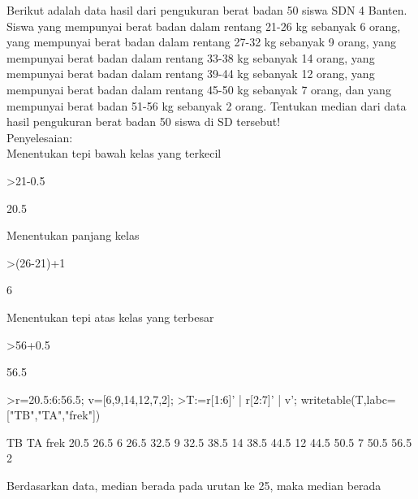\documentclass[a4paper,10pt]{article}
\begin{document}
\begin{eulernotebook}
\begin{eulercomment}
\begin{eulercomment}
\begin{eulercomment}
\begin{eulercomment}
\begin{eulercomment}
\begin{eulercomment}
\begin{eulercomment}
\end{eulercomment}
\begin{eulercomment}
Berikut adalah data hasil dari pengukuran berat badan 50 siswa SDN 4
Banten. Siswa yang mempunyai berat badan dalam rentang 21-26 kg
sebanyak 6 orang, yang mempunyai berat badan dalam rentang 27-32 kg
sebanyak 9 orang, yang mempunyai berat badan dalam rentang 33-38 kg
sebanyak 14 orang, yang mempunyai berat badan dalam rentang 39-44 kg
sebanyak 12 orang, yang mempunyai berat badan dalam rentang 45-50 kg
sebanyak 7 orang, dan yang mempunyai berat badan 51-56 kg sebanyak 2
orang. Tentukan median dari data hasil pengukuran berat badan 50 siswa
di SD tersebut!\\
Penyelesaian:\\
Menentukan tepi bawah kelas yang terkecil
\end{eulercomment}
\begin{eulerprompt}
>21-0.5
\end{eulerprompt}
\begin{euleroutput}
  20.5
\end{euleroutput}
\begin{eulercomment}
Menentukan panjang kelas
\end{eulercomment}
\begin{eulerprompt}
>(26-21)+1
\end{eulerprompt}
\begin{euleroutput}
  6
\end{euleroutput}
\begin{eulercomment}
Menentukan tepi atas kelas yang terbesar
\end{eulercomment}
\begin{eulerprompt}
>56+0.5
\end{eulerprompt}
\begin{euleroutput}
  56.5
\end{euleroutput}
\begin{eulerprompt}
>r=20.5:6:56.5; v=[6,9,14,12,7,2];
>T:=r[1:6]' | r[2:7]' | v'; writetable(T,labc=["TB","TA","frek"])
\end{eulerprompt}
\begin{euleroutput}
          TB        TA      frek
        20.5      26.5         6
        26.5      32.5         9
        32.5      38.5        14
        38.5      44.5        12
        44.5      50.5         7
        50.5      56.5         2
\end{euleroutput}
\begin{eulercomment}
Berdasarkan data, median berada pada urutan ke 25, maka median berada

\end{eulercomment}
\end{eulercomment}
\end{eulercomment}
\end{eulercomment}
\end{eulercomment}
\end{eulercomment}
\end{eulercomment}
\end{eulernotebook}
\end{document}
